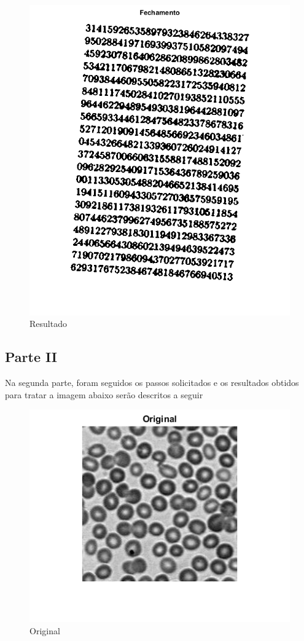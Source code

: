 \documentclass[journal]{IEEEtran}
\begin{document}
\begin{figure}[!htb]
	\centering
	\includegraphics[scale=0.25]{fechamento.png}
	\caption{Resultado}
	\label{Original}
\end{figure}


\subsection{Parte II}

Na segunda parte, foram seguidos os passos solicitados e os resultados obtidos para tratar a imagem abaixo serão descritos a seguir

\begin{figure}[!htb]
	\centering
	\includegraphics[scale=0.5]{2.png}
	\caption{Original}
	\label{Original}
\end{figure}
\end{document}

